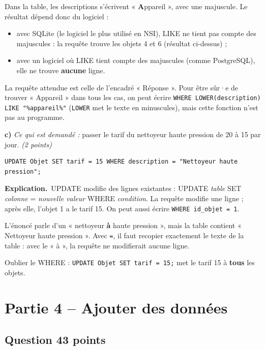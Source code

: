 \documentclass[11pt, a4paper]{exam}
\newcommand{\code}[1]{\texttt{#1}}
\newcommand{\Qt}[2]{\subsection*{#1\hfill{\normalfont\small #2}}}
\newcommand{\rappel}[1]{\noindent\textit{Ce qui est demandé :} #1\par\smallskip}
\newcommand{\explication}{\noindent\textbf{Explication.}\ }
\newcommand{\sql}[1]{\textsc{#1}}
\begin{document}
\begin{remarque}
Dans la table, les descriptions s'écrivent « \textbf{A}ppareil », avec une majuscule. Le résultat dépend donc du logiciel :
\begin{itemize}
\item avec SQLite (le logiciel le plus utilisé en NSI), \sql{LIKE} ne tient pas compte des majuscules : la requête trouve les objets 4 et 6 (résultat ci-dessus) ;
\item avec un logiciel où \sql{LIKE} tient compte des majuscules (comme PostgreSQL), elle ne trouve \textbf{aucune} ligne.
\end{itemize}
La requête attendue est celle de l'encadré « Réponse ». Pour être sûr·e de trouver « Appareil » dans tous les cas, on peut écrire \code{WHERE LOWER(description) LIKE "\%appareil\%"} (\code{LOWER} met le texte en minuscules), mais cette fonction n'est pas au programme.
\end{remarque}

\textbf{c)} \rappel{passer le tarif du nettoyeur haute pression de 20 \texteuro{} à 15 \texteuro{} par jour. \hfill\textit{(2 points)}}
\begin{reponse}
\begin{lstlisting}
UPDATE Objet SET tarif = 15 WHERE description = "Nettoyeur haute pression";
\end{lstlisting}
\end{reponse}
\explication \sql{UPDATE} modifie des lignes existantes : \sql{UPDATE} \textit{table} \sql{SET} \textit{colonne} = \textit{nouvelle valeur} \sql{WHERE} \textit{condition}. La requête modifie une ligne ; après elle, l'objet 1 a le tarif 15. On peut aussi écrire \code{WHERE id\_objet = 1}.

\begin{remarque}
L'énoncé parle d'un « nettoyeur \textbf{à} haute pression », mais la table contient « Nettoyeur haute pression ». Avec \code{=}, il faut recopier exactement le texte de la table : avec le « à », la requête ne modifierait aucune ligne.
\end{remarque}

\begin{erreur}
Oublier le \sql{WHERE} : \code{UPDATE Objet SET tarif = 15;} met le tarif 15 à \textbf{tous} les objets.
\end{erreur}

\section*{Partie 4 -- Ajouter des données}
\Qt{Question 4}{3 points}
\end{document}
